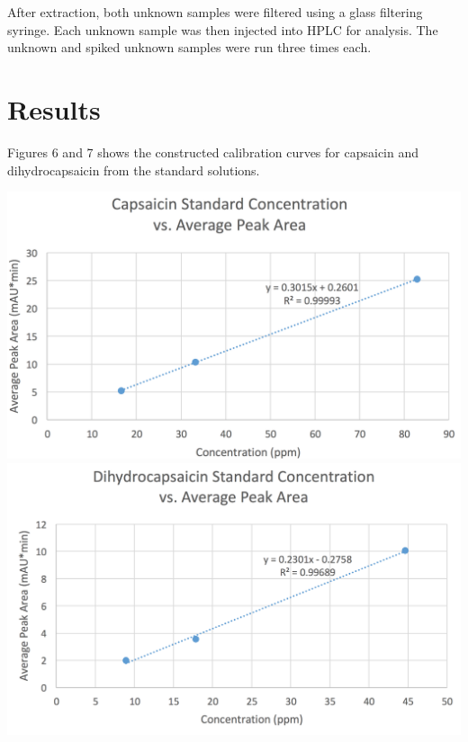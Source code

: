 \documentclass{article}
\begin{document}
\begin{multicols}{2}
{    After extraction, both unknown samples were filtered using a glass filtering
    syringe. Each unknown sample was then injected into HPLC for analysis.
    The unknown and spiked unknown samples were run three times each.


\section*{Results}

Figures 6 and 7 shows the constructed calibration curves for capsaicin and
dihydrocapsaicin from the standard solutions.
\begin{center}
    \includegraphics[scale=0.2]{calibration_capsaicin}
    \includegraphics[scale=0.2]{calibration_dihydrocapsaicin}
\end{center}

}
\end{multicols}
\end{document}
